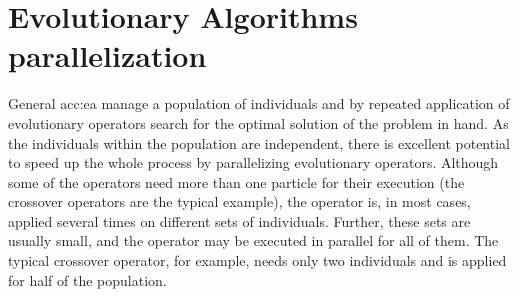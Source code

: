\section{Evolutionary Algorithms parallelization}

General \acrlong{acc:ea} manage a population of individuals and by repeated application of evolutionary operators search for the optimal solution of the problem in hand. As the individuals within the population are independent, there is excellent potential to speed up the whole process by parallelizing evolutionary operators. Although some of the operators need more than one particle for their execution (the crossover operators are the typical example), the operator is, in most cases, applied several times on different sets of individuals. Further, these sets are usually small, and the operator may be executed in parallel for all of them. The typical crossover operator, for example, needs only two individuals and is applied for half of the population.

